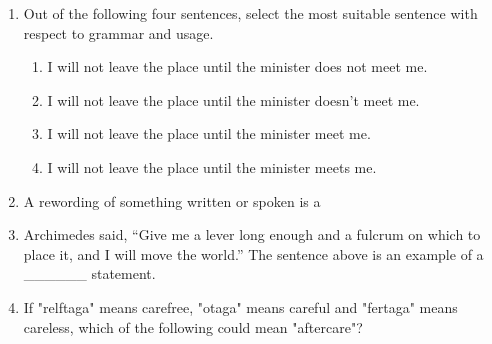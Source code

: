 \documentclass[journal]{IEEEtran}
\begin{document}
\begin{enumerate}
\item Out of the following four sentences, select the most suitable sentence with respect to grammar and usage. \hfill {}
\begin{enumerate}

\item I will not leave the place until the minister does not meet me.
\item I will not leave the place until the minister doesn't meet me.
\item I will not leave the place until the minister meet me.
\item I will not leave the place until the minister meets me.

\end{enumerate}

\item A rewording of something written or spoken is a  \hfill {}
\begin{enumerate}
\end{enumerate}

\item Archimedes said, ``Give me a lever long enough and a fulcrum on which to place it, and I will move the world.'' The sentence above is an example of a \_\_\_\_\_\_ statement. \hfill {}
\begin{enumerate}
\end{enumerate}

\item If "relftaga" means carefree, "otaga" means careful and "fertaga" means careless, which of the following could mean "aftercare"? \hfill {}
\begin{enumerate}
\end{enumerate}


\end{enumerate}
\end{document}

